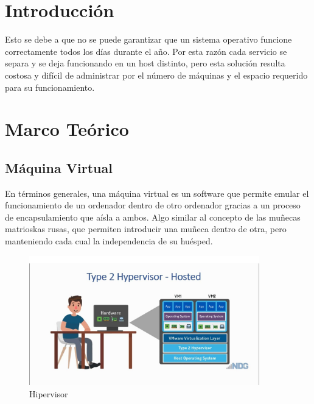 \documentclass[preprint,12pt]{elsarticle}
\begin{document}
\section{Introducción}

Esto se debe a que no se puede garantizar que un sistema operativo funcione correctamente todos los días durante el año. Por esta razón cada servicio se separa y se deja funcionando en un host distinto, pero esta solución resulta costosa y difícil de administrar por el número de máquinas y el espacio requerido para su funcionamiento.







\section{Marco Teórico}


\subsection {\textbf{Máquina Virtual}}
En términos generales, una máquina virtual es un software que permite emular el funcionamiento de un ordenador dentro de otro ordenador gracias a un proceso de encapsulamiento que aísla a ambos. Algo similar al concepto de las muñecas matrioskas rusas, que permiten introducir una muñeca dentro de otra, pero manteniendo cada cual la independencia de su huésped.\cite{Citrix2018}

	\begin{figure}[htb]
	\begin{center}
		\includegraphics[width=10cm]{./IMAGENES/1} 
		\caption{Hipervisor}
	\end{center}
\end{figure}
\end{document}
